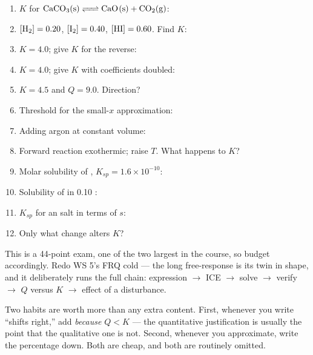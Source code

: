 \documentclass{apchem-worksheet}
\begin{document}
\begin{enumerate}[leftmargin=*,itemsep=0.38em]
  \item $K$ for $\ce{CaCO3(s) <=> CaO(s) + CO2(g)}$:
        \answerblank[2.6cm]{$[\ce{CO2}]$}
  \item $[\ce{H2}]=0.20$, $[\ce{I2}]=0.40$, $[\ce{HI}]=0.60$. Find $K$:
  \item $K = 4.0$; give $K$ for the reverse:
  \item $K = 4.0$; give $K$ with coefficients doubled:
  \item $K = 4.5$ and $Q = 9.0$. Direction?
  \item Threshold for the small-$x$ approximation:
  \item Adding argon at constant volume:
  \item Forward reaction exothermic; raise $T$. What happens to $K$?
  \item Molar solubility of , $K_{sp} = 1.6\times10^{-10}$:
  \item Solubility of  in \SI{0.10}{\Molar} :
  \item $K_{sp}$ for an  salt in terms of $s$:
  \item Only what change alters $K$?
\end{enumerate}

\begin{apcnote}
This is a 44-point exam, one of the two largest in the course, so budget
accordingly. Redo WS 5's FRQ cold --- the long free-response is its twin in
shape, and it deliberately runs the full chain: expression $\to$ ICE $\to$
solve $\to$ verify $\to$ $Q$ versus $K$ $\to$ effect of a disturbance.

Two habits are worth more than any extra content. First, whenever you write
``shifts right,'' add \emph{because $Q < K$} --- the quantitative
justification is usually the point that the qualitative one is not. Second,
whenever you approximate, write the percentage down. Both are cheap, and
both are routinely omitted.
\end{apcnote}
\end{document}
